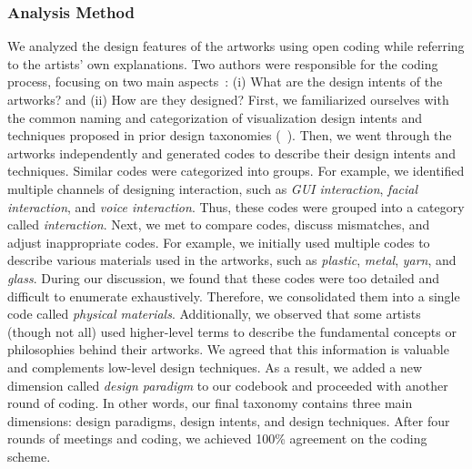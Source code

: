 




\subsubsection{Analysis Method}


We analyzed the design features of the artworks using open coding while referring to the artists' own explanations.
Two authors were responsible for the coding process, focusing on two main aspects~\cite{shi2021communicating,sarikaya2018we}: (i) What are the design intents of the artworks? and (ii) How are they designed? First, we familiarized ourselves with the common naming and categorization of visualization design intents and techniques proposed in prior design taxonomies (\eg ~\cite{lan2023affective}).
Then, we went through the artworks independently and generated codes to describe their design intents and techniques. Similar codes were categorized into groups. For example, we identified multiple channels of designing interaction, such as \textit{GUI interaction}, \textit{facial interaction}, and \textit{voice interaction}. Thus, these codes were grouped into a category called \textit{interaction}.
Next, we met to compare codes, discuss mismatches, and adjust inappropriate codes. For example, we initially used multiple codes to describe various materials used in the artworks, such as \textit{plastic}, \textit{metal}, \textit{yarn}, and \textit{glass}. During our discussion, we found that these codes were too detailed and difficult to enumerate exhaustively. Therefore, we consolidated them into a single code called \textit{physical materials}. Additionally, we observed that some artists (though not all) used higher-level terms to describe the fundamental concepts or philosophies behind their artworks. We agreed that this information is valuable and complements low-level design techniques. As a result, we added a new dimension called \textit{design paradigm} to our codebook and proceeded with another round of coding. In other words, our final taxonomy contains three main dimensions: design paradigms, design intents, and design techniques. After four rounds of meetings and coding, we achieved 100\% agreement on the coding scheme.


